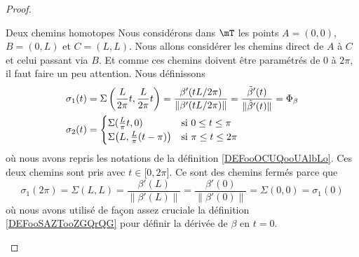 \begin{proof}
\begin{subproof}
    \item[Deux chemins homotopes]
            Nous considérons dans \( \mT\) les points \( A=(0,0)\), \( B=(0,L)\) et \( C=(L,L)\). Nous allons considérer les chemins direct de \( A\) à \( C\) et celui passant via \( B\). Et comme ces chemins doivent être paramétrés de \( 0\) à \( 2 \pi\), il faut faire un peu attention. Nous définissons
            \begin{subequations}
                \begin{align}
                    \sigma_1(t)&=\Sigma\left( \frac{ L }{ 2\pi }t,\frac{ L }{ 2\pi }t \right)=\frac{ \beta'(tL/2\pi) }{ \| \beta'(tL/2\pi) \| }=\frac{ \tilde \beta'(t) }{ \|\tilde  \beta'(t) \| }=\Phi_{\beta}\\
                    \sigma_2(t)&=\begin{cases}
                        \Sigma(\frac{ L }{ \pi }t,0)    &   \text{si \( 0\leq t\leq \pi\)}\\
                        \Sigma\big(L, \frac{ L }{ \pi }(t-\pi)  \big)    &    \text{si \(\pi\leq t\leq 2\pi\)}
                    \end{cases}
                \end{align}
            \end{subequations}
            où nous avons repris les notations de la définition \ref{DEFooOCUQooUAlbLo}. Ces deux chemins sont pris avec \( t\in\mathopen[ 0 , 2\pi \mathclose]\). Ce sont des chemins fermés parce que
            \begin{equation}
                \sigma_1(2\pi)=\Sigma(L,L)=\frac{ \beta'(L) }{ \| \beta'(L) \| }=\frac{ \beta'(0) }{ \| \beta'(0) \| }=\Sigma(0,0)=\sigma_1(0)
            \end{equation}
            où nous avons utilisé de façon assez cruciale la définition \ref{DEFooSAZTooZGQrQG} pour définir la dérivée de \( \beta\) en \( t=0\).


\end{subproof}
\end{proof}
